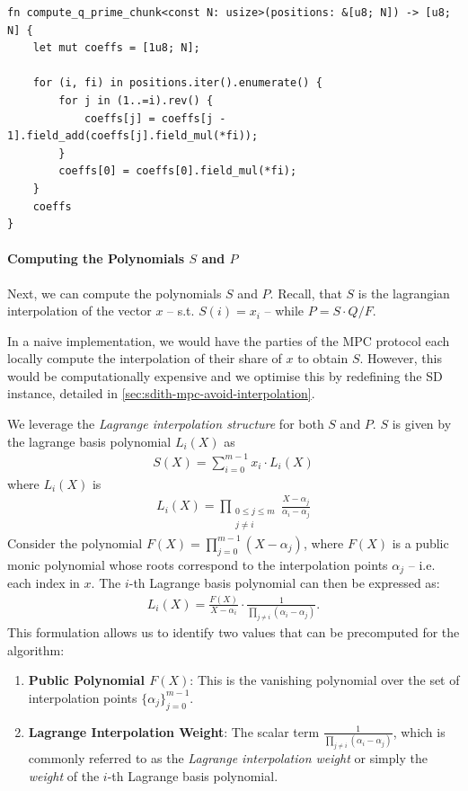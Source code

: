 \documentclass[11pt]{report}
\theoremstyle{definition}
\theoremstyle{plain}
\begin{document}
\begin{verbatim}
fn compute_q_prime_chunk<const N: usize>(positions: &[u8; N]) -> [u8; N] {
    let mut coeffs = [1u8; N];

    for (i, fi) in positions.iter().enumerate() {
        for j in (1..=i).rev() {
            coeffs[j] = coeffs[j - 1].field_add(coeffs[j].field_mul(*fi));
        }
        coeffs[0] = coeffs[0].field_mul(*fi);
    }
    coeffs
}
\end{verbatim}

\paragraph{Computing the Polynomials $S$ and $P$}

Next, we can compute the polynomials $S$ and $P$. Recall, that $S$ is the lagrangian interpolation of the vector $x$ -- s.t. $S(i) = x_i$ -- while $P = S \cdot Q / F$.

In a naive implementation, we would have the parties of the MPC protocol each locally compute the interpolation of their share of $x$ to obtain $S$. However, this would be computationally expensive and we optimise this by redefining the SD instance, detailed in \autoref{sec:sdith-mpc-avoid-interpolation}.

We leverage the \textit{Lagrange interpolation structure} for both $S$ and $P$. $S$ is given by the lagrange basis polynomial $L_i(X)$ as
\begin{align*}
  S(X) = \sum_{i=0}^{m-1} x_i \cdot L_i(X)
\end{align*}
where $L_i(X)$ is
\begin{align*}
  L_i(X) = \prod_{\substack{0\leq j\leq m \\ j\neq i}} \frac{X-\alpha_j}{\alpha_i-\alpha_j}
\end{align*}
Consider the polynomial $F(X) = \prod_{j=0}^{m-1} (X - \alpha_j)$, where $F(X)$ is a public monic polynomial whose roots correspond to the interpolation points $\alpha_j$ -- i.e. each index in $x$. The $i$-th Lagrange basis polynomial can then be expressed as:
\begin{align*}
  L_i(X) = \frac{F(X)}{X - \alpha_i} \cdot \frac{1}{\prod_{j \neq i} (\alpha_i - \alpha_j)}.
\end{align*}
This formulation allows us to identify two values that can be precomputed for the algorithm:

\begin{enumerate}
  \item \textbf{Public Polynomial $F(X)$}: This is the vanishing polynomial over the set of interpolation points $\{\alpha_j\}_{j=0}^{m-1}$.
  \item \textbf{Lagrange Interpolation Weight}: The scalar term $\frac{1}{\prod_{j \neq i} (\alpha_i - \alpha_j)}$, which is commonly referred to as the \textit{Lagrange interpolation weight} or simply the \textit{weight} of the $i$-th Lagrange basis polynomial.
\end{enumerate}
\end{document}
